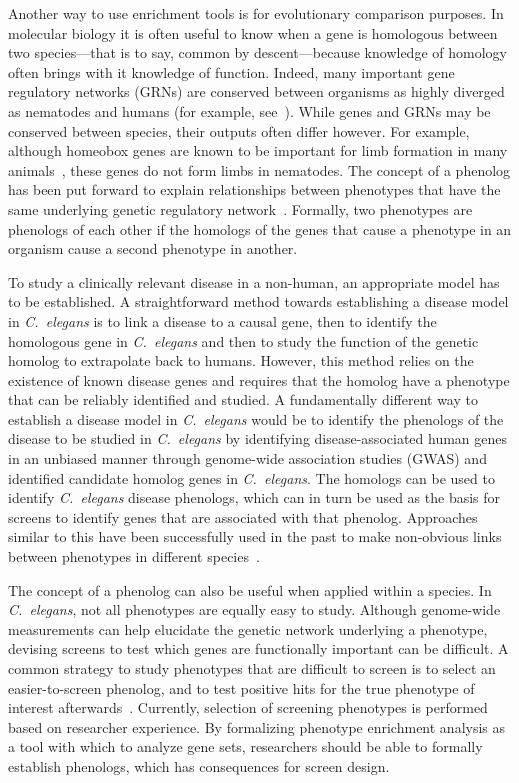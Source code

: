 \documentclass[10pt,letterpaper,twocolumn]{article}
\newcommand{\cel}{\emph{C.~elegans}}
\begin{document}
Another way to use enrichment tools is for evolutionary comparison purposes.
In molecular biology it is often useful to know when a gene is homologous
between two species---that is to say, common by descent---because knowledge of
homology often brings with it knowledge of function. Indeed, many
important gene regulatory networks (GRNs) are conserved between organisms as
highly diverged as nematodes and humans (for example, see~\cite{Sternberg1998}).
While genes
and GRNs may be conserved between species, their outputs often differ however.
For example, although homeobox genes are known to be important for limb
formation in many animals~\cite{Zakany2007}, these genes do not form limbs in nematodes.
The concept of a phenolog has been put forward to explain relationships between
phenotypes that have the same underlying genetic
regulatory network~\cite{McGary2010,Lehner2013}.
Formally, two phenotypes are phenologs of each other if the homologs of the
genes that cause a phenotype in an organism cause a second phenotype in another.

To study a clinically relevant disease in a non-human, an appropriate
model has to be established. A straightforward method towards establishing a
disease model in
\cel{} is to link a disease to a causal gene, then to identify the homologous
gene in \cel{} and then to study the function of the genetic homolog to
extrapolate back to humans. However, this method relies on the existence of
known disease genes and requires that the homolog have a phenotype that can be
reliably identified and studied. A fundamentally different way to establish a
disease model in \cel{} would be to identify the phenologs of the disease to be
studied in \cel{} by identifying disease-associated human genes in an unbiased
manner through genome-wide association studies (GWAS) and identified candidate
homolog genes in \cel{}. The homologs can be used to identify \cel{} disease
phenologs, which can in turn be used as the basis for screens to identify
genes that are associated with that phenolog. Approaches similar to this have
been successfully used in the past to make non-obvious links between phenotypes
in different species~\cite{McGary2010}.

The concept of a phenolog can also be useful when applied within a species.
In \cel{}, not all phenotypes are equally easy to study. Although genome-wide
measurements can help elucidate the genetic network underlying a phenotype,
devising screens to test which genes are functionally important can be difficult.
A common strategy to study phenotypes that are difficult to screen is to
select an easier-to-screen phenolog, and to test positive hits for the true
phenotype of interest
afterwards~\cite{}. Currently, selection of screening phenotypes is
performed based on researcher experience.
By formalizing phenotype enrichment analysis as a tool with which to analyze
gene sets, researchers should be able to formally establish phenologs, which has
consequences for screen design.
\end{document}
